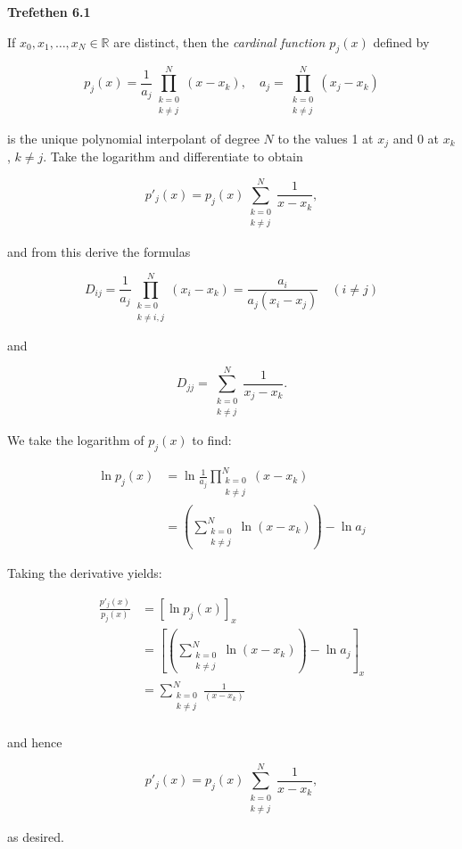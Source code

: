 \textbf{Trefethen 6.1}

If $x_0, x_1, \ldots, x_N \in \mathbb{R}$ are distinct, then the \textit{cardinal function $p_j(x)$} defined by 

$$
p_j(x) = \frac{1}{a_j} \prod\limits_{\substack{k=0 \\ k \neq j}}^{N}(x - x_k), \quad a_j = \prod\limits_{\substack{k=0 \\ k \neq j}}^{N}(x_j - x_k)
$$

is the unique polynomial interpolant of degree $N$ to the values 1 at $x_j$ and 0 at $x_k$, $k \neq j$. Take the 
logarithm and differentiate to obtain 

$$
p'_j(x) = p_j(x) \sum\limits_{\substack{k=0 \\ k \neq j}}^N \frac{1}{x - x_k},
$$

and from this derive the formulas

$$
D_{ij} = \frac{1}{a_j} \prod\limits_{\substack{k=0 \\ k \neq i,j}}^N (x_i - x_k) = \frac{a_i}{a_j(x_i - x_j)} \quad (i \neq j)
$$

and 

$$
D_{jj} = \sum\limits_{\substack{k=0 \\ k \neq j}}^N \frac{1}{x_j - x_k}.
$$

\begin{solution}
  We take the logarithm of $p_j(x)$ to find:

  \begin{align*}
    \ln{p_j(x)} &= \ln{\frac{1}{a_j} \prod\limits_{\substack{k=0 \\ k \neq j}}^{N} (x - x_k)} \\
                &= \left( \sum\limits_{\substack{k=0 \\ k \neq j}}^{N} \ln{(x - x_k)} \right) - \ln{a_j} 
  \end{align*}

  \pagebreak
  Taking the derivative yields:

  \begin{align*}
    \frac{p'_j(x)}{p_j(x)} &= \left[ \ln{p_j(x)} \right]_x  \\
                           &= \left[ \left( \sum\limits_{\substack{k=0 \\ k \neq j}}^{N} \ln{(x - x_k)} \right) - \ln{a_j} \right]_x \\
                           &= \sum\limits_{\substack{k=0 \\ k \neq j}}^{N} \frac{1}{(x - x_k)} \\
  \end{align*}

  and hence

  $$
    p'_j(x) = p_j(x) \sum\limits_{\substack{k=0 \\ k \neq j}}^N \frac{1}{x - x_k},
  $$

  as desired.
\end{solution}